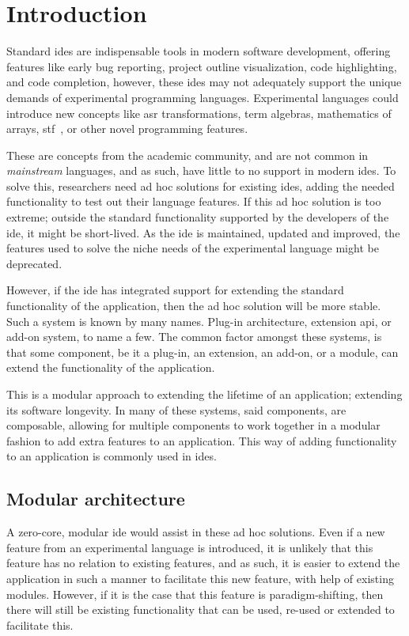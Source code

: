 \chapter{Introduction}

Standard \gls*{ide}s are indispensable tools in modern software development,
offering features like early bug reporting, project outline visualization, code
highlighting, and code completion, however, these \gls*{ide}s may not adequately
support the unique demands of experimental programming languages. Experimental
languages could introduce new concepts like \gls*{asr} transformations, term
algebras, mathematics of arrays, \gls*{stf}~\cite{stf:haveraaen:2020}, or other novel
programming features.

These are concepts from the academic community, and are not common in
\textit{mainstream} languages, and as such, have little to no support in modern
\gls*{ide}s. To solve this, researchers need ad hoc solutions for existing
\gls*{ide}s, adding the needed functionality to test out their language
features. If this ad hoc solution is too extreme; outside the standard
functionality supported by the developers of the \gls*{ide}, it might be
short-lived. As the \gls*{ide} is maintained, updated and improved, the features
used to solve the niche needs of the experimental language might be deprecated.

However, if the \gls*{ide} has integrated support for extending the standard
functionality of the application, then the ad hoc solution will be more stable.
Such a system is known by many names. Plug-in architecture, extension \gls*{api},
or add-on system, to name a few. The common factor amongst these systems, is
that some component, be it a plug-in, an extension, an add-on, or a module, can
extend the functionality of the application.

This is a modular approach to extending the lifetime of an application;
extending its software longevity. In many of these systems, said components, are
composable, allowing for multiple components to work together in a modular
fashion to add extra features to an application. This way of adding
functionality to an application is commonly used in \gls*{ide}s.


\section{Modular architecture}

A zero-core, modular \gls*{ide} would assist in these ad hoc solutions. Even if
a new feature from an experimental language is introduced, it is unlikely that
this feature has no relation to existing features, and as such, it is easier to
extend the application in such a manner to facilitate this new feature, with help of
existing modules. However, if it is the case that this feature is
paradigm-shifting, then there will still be existing functionality that can be
used, re-used or extended to facilitate this.

